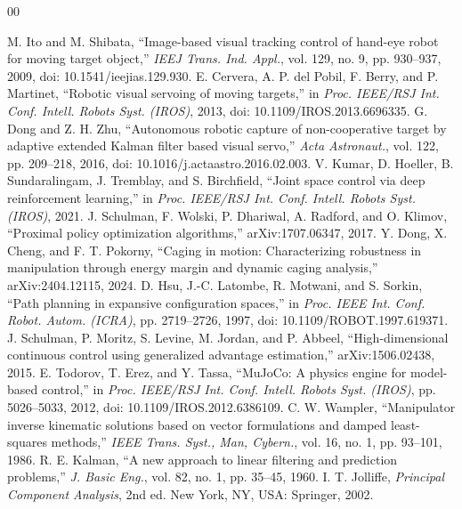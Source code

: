 \documentclass[conference]{IEEEtran}
\begin{document}
\begin{thebibliography}{00}

M. Ito and M. Shibata, “Image-based visual tracking control of hand-eye robot for moving target object,” \emph{IEEJ Trans. Ind. Appl.}, vol. 129, no. 9, pp. 930--937, 2009, doi: 10.1541/ieejias.129.930.
E. Cervera, A. P. del Pobil, F. Berry, and P. Martinet, “Robotic visual servoing of moving targets,” in \emph{Proc. IEEE/RSJ Int. Conf. Intell. Robots Syst. (IROS)}, 2013, doi: 10.1109/IROS.2013.6696335.
G. Dong and Z. H. Zhu, “Autonomous robotic capture of non-cooperative target by adaptive extended Kalman filter based visual servo,” \emph{Acta Astronaut.}, vol. 122, pp. 209--218, 2016, doi: 10.1016/j.actaastro.2016.02.003.
V. Kumar, D. Hoeller, B. Sundaralingam, J. Tremblay, and S. Birchfield, “Joint space control via deep reinforcement learning,” in \emph{Proc. IEEE/RSJ Int. Conf. Intell. Robots Syst. (IROS)}, 2021.
J. Schulman, F. Wolski, P. Dhariwal, A. Radford, and O. Klimov, “Proximal policy optimization algorithms,” arXiv:1707.06347, 2017.
Y. Dong, X. Cheng, and F. T. Pokorny, “Caging in motion: Characterizing robustness in manipulation through energy margin and dynamic caging analysis,” arXiv:2404.12115, 2024.
D. Hsu, J.-C. Latombe, R. Motwani, and S. Sorkin, “Path planning in expansive configuration spaces,” in \emph{Proc. IEEE Int. Conf. Robot. Autom. (ICRA)}, pp. 2719--2726, 1997, doi: 10.1109/ROBOT.1997.619371.
J. Schulman, P. Moritz, S. Levine, M. Jordan, and P. Abbeel, “High-dimensional continuous control using generalized advantage estimation,” arXiv:1506.02438, 2015.
E. Todorov, T. Erez, and Y. Tassa, “MuJoCo: A physics engine for model-based control,” in \emph{Proc. IEEE/RSJ Int. Conf. Intell. Robots Syst. (IROS)}, pp. 5026--5033, 2012, doi: 10.1109/IROS.2012.6386109.
C. W. Wampler, “Manipulator inverse kinematic solutions based on vector formulations and damped least-squares methods,” \emph{IEEE Trans. Syst., Man, Cybern.}, vol. 16, no. 1, pp. 93--101, 1986.
R. E. Kalman, “A new approach to linear filtering and prediction problems,” \emph{J. Basic Eng.}, vol. 82, no. 1, pp. 35--45, 1960.
I. T. Jolliffe, \emph{Principal Component Analysis}, 2nd ed. New York, NY, USA: Springer, 2002.
\end{thebibliography}
\end{document}
